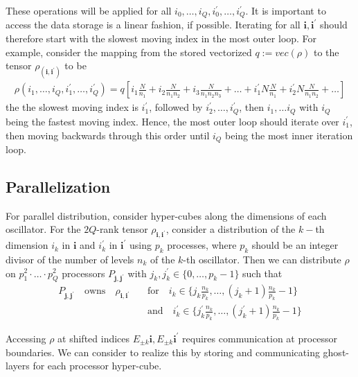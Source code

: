 \documentclass[letterpaper]{article}
\newcommand{\bfi}{\boldsymbol{i}}
\newcommand{\bfj}{\boldsymbol{j}}
\newcommand{\p}{\prime}
\begin{document}
  These operations will be applied for all $i_0,\dots, i_Q, i_0^\prime, \dots, i_Q^\prime$. It is important to access the data storage is a linear fashion, if possible. Iterating for all $\bfi, \bfi^\prime$ should therefore start with the slowest moving index in the most outer loop. For example, consider the mapping from the stored vectorized $q := vec(\rho)$ to the tensor $\rho_(\bfi,\bfi^\prime)$ to be
    \begin{align}
        \rho(i_1,\dots,i_Q,i_1^\prime,\dots,i_Q^\prime) = q[i_1 \frac{N}{n_1} + i_2\frac{N}{n_1n_2} + i_3\frac{N}{n_1n_2n_3} + \dots + i_1^\prime N\frac{N}{n_1} + i_2^\prime N\frac{N}{n_1n_2} + \dots]
    \end{align}
  the the slowest moving index is $i_1^\prime$, followed by $i_2^\prime, \dots, i_Q^\prime$, then $i_1, \dots i_Q$ with $i_Q$ being the fastest moving index. Hence, the most outer loop should iterate over $i_1^\prime$, then moving backwards through this order until $i_Q$ being the most inner iteration loop.

 \subsection{Parallelization} 
 
 For parallel distribution, consider hyper-cubes along the dimensions of each oscillator. For the $2Q$-rank tensor $\rho_{\bfi, \bfi^\p}$, consider a distribution of the $k-$th dimension $i_k$ in $\bfi$ and $i_k^\p$ in $\bfi^\p$ using $p_k$ processes, where $p_k$ should be an integer divisor of the number of levels $n_k$ of the $k$-th oscillator. Then we can distribute $\rho$ on $p_1^2\cdot \ldots \cdot p_Q^2$ processors $P_{\bfj, \bfj^\p}$ with $j_k, j_k^\p \in \{0,\dots,p_k-1\}$ such that
 \begin{align}
   P_{\bfj, \bfj^\p} \quad \text{owns} \quad \rho_{\bfi, \bfi^\p} \quad &\text{for} \quad i_k \in \{ j_k \frac{n_k}{p_k}, \dots, \left(j_k+1\right) \frac{n_k}{p_k} - 1 \}\\
    &\text{and} \quad i_k^\p \in \{ j_k^\p \frac{n_k}{p_k}, \dots, \left(j_k^\p+1\right) \frac{n_k}{p_k} - 1 \}
 \end{align}

 Accessing $\rho$ at shifted indices $E_{\pm k}\bfi, E_{\pm k}\bfi^\p$ requires communication at processor boundaries. We can consider to realize this by storing and communicating ghost-layers for each processor hyper-cube.
\end{document}
